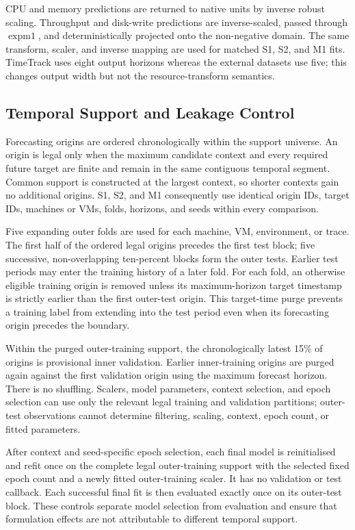 \documentclass[a4paper,fleqn]{cas-dc}
\begin{document}
CPU and memory predictions are returned to native units by inverse robust
scaling.  Throughput and disk-write predictions are inverse-scaled, passed
through $\operatorname{expm1}$, and deterministically projected onto the
non-negative domain.  The same transform, scaler, and inverse mapping are used
for matched S1, S2, and M1 fits.  TimeTrack uses eight output horizons whereas
the external datasets use five; this changes output width but not the
resource-transform semantics.

\subsection{Temporal Support and Leakage Control}
\label{sec:leakage-control}

Forecasting origins are ordered chronologically within the support universe.
An origin is legal only when the maximum candidate context and every required
future target are finite and remain in the same contiguous temporal segment.
Common support is constructed at the largest context, so shorter contexts gain
no additional origins.  S1, S2, and M1 consequently use identical origin IDs,
target IDs, machines or VMs, folds, horizons, and seeds within every
comparison.

Five expanding outer folds are used for each machine, VM, environment, or
trace.  The first half of the ordered legal origins precedes the first test
block; five successive, non-overlapping ten-percent blocks form the outer
tests.  Earlier test periods may enter the training history of a later fold.
For each fold, an otherwise eligible training origin is removed unless its
maximum-horizon target timestamp is strictly earlier than the first outer-test
origin.  This target-time purge prevents a training label from extending into
the test period even when its forecasting origin precedes the boundary.

Within the purged outer-training support, the chronologically latest 15\% of
origins is provisional inner validation.  Earlier inner-training origins are
purged again against the first validation origin using the maximum forecast
horizon.  There is no shuffling.  Scalers, model parameters, context selection,
and epoch selection can use only the relevant legal training and validation
partitions; outer-test observations cannot determine filtering, scaling,
context, epoch count, or fitted parameters.

After context and seed-specific epoch selection, each final model is
reinitialised and refit once on the complete legal outer-training support with
the selected fixed epoch count and a newly fitted outer-training scaler.  It
has no validation or test callback.  Each successful final fit is then
evaluated exactly once on its outer-test block.  These controls separate model
selection from evaluation and ensure that formulation effects are not
attributable to different temporal support.
\end{document}
